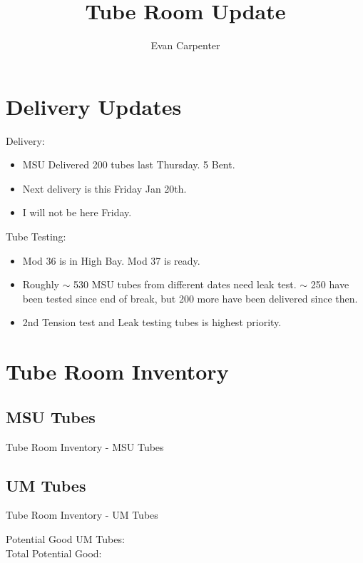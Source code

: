 \documentclass{beamer}
\title{Tube Room Update \\ \insertdate}
\date{}
\author{Evan Carpenter}
\begin{document}
\titlepage

\section{Delivery Updates}
	\begin{frame}
		\begin{block}{Delivery:}
			\begin{itemize}
				\item \small MSU Delivered 200 tubes last Thursday. 5 Bent. 
				\item Next delivery is this Friday Jan 20th.
				\item I will not be here Friday.  
			\end{itemize}
		\end{block}	
		\begin{block}{Tube Testing:}
			\begin{itemize}
				\item Mod 36 is in High Bay. Mod 37 is ready. %
				\item Roughly $\sim$ 530 MSU tubes from different dates need leak test. $\sim$ 250 have been tested since end of break, but 200 more have been delivered since then.
				\item 2nd Tension test and Leak testing tubes is highest priority. 
			\end{itemize}
		\end{block}
	\end{frame}


\section{Tube Room Inventory}
\subsection{MSU Tubes}

	\begin{frame}{Tube Room Inventory - MSU Tubes}
		\begin{figure}
			\centering
			\scalebox{0.5}{}
			\scalebox{0.5}{}
		\end{figure}
		\centering
	\end{frame}

\subsection{UM Tubes}
	\begin{frame}{Tube Room Inventory - UM Tubes}
		\begin{figure}
			\centering
			\scalebox{0.5}{}
		\end{figure}
		\centering
		Potential Good UM Tubes: \\
		Total Potential Good:
	\end{frame}
\end{document}
